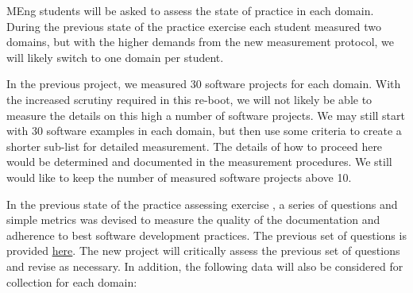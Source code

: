 \documentclass[12pt]{article}
\begin{document}
MEng students will be asked to assess the state of practice in each domain.
During the previous state of the practice exercise each student measured two
domains, but with the higher demands from the new measurement protocol, we will
likely switch to one domain per student.

In the previous project, we measured 30 software projects for each domain.  With
the increased scrutiny required in this re-boot, we will not likely be able to
measure the details on this high a number of software projects.  We may still
start with 30 software examples in each domain, but then use some criteria to
create a shorter sub-list for detailed measurement.  The details of how to
proceed here would be determined and documented in the measurement procedures.
We still would like to keep the number of measured software projects above 10.

In the previous state of the practice assessing exercise
\citep{SmithEtAl2018_arXivGIS}, a series of questions and simple metrics was
devised to measure the quality of the documentation and adherence to best
software development practices.  The previous set of questions is provided
\href{https://github.com/adamlazz/DomainX/blob/master/TemplateToGradeSCSoft.pdf}
{here}. The new project will critically assess the previous set of questions and
revise as necessary.  In addition, the following data will also be considered
for collection for each domain:
\end{document}
